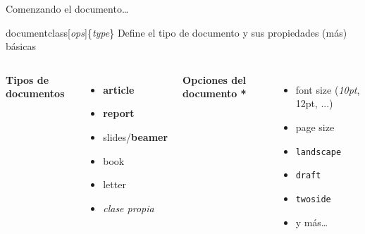 \begin{frame}{Comenzando el documento\ldots}

    \begin{block}{documentclass[\textit{ops}]\{\textit{type}\}}
        Define el tipo de documento y sus propiedades (más) básicas
    \end{block}

    \pause

    \vspace{0.5cm}

    \begin{columns}

        \textbf{Tipos de documentos}
        \begin{itemize}
            \item \textbf{article}
            \item \textbf{report}
            \item slides/\textbf{beamer}
            \item book
            \item letter
            \item \textit{clase propia}
        \end{itemize}
        
        \pause
        
        \textbf{Opciones del documento *}
        \begin{itemize}
            \item font size (\textit{10pt}, 12pt, ...)
            \item page size
            \item \texttt{landscape}
            \item \texttt{draft}
            \item \texttt{twoside}
            \item y más\ldots{}
        \end{itemize}
        
    \end{columns}
    
\end{frame}



